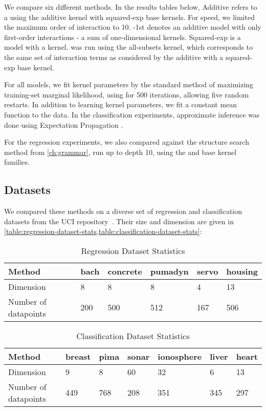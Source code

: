 We compare six different methods.
In the results tables below, \gp{} Additive refers to a \gp{} using the additive kernel with squared-exp base kernels.
For speed, we limited the maximum order of interaction to 10.
\gp{}-1st denotes an additive \gp{} model with only first-order interactions - a sum of one-dimensional kernels.
\gp{} Squared-exp is a \gp{} model with a \seard{} kernel.
\HKL{} was run using the all-subsets kernel, which corresponds to the same set of interaction terms as considered by the additive \gp{} with a squared-exp base kernel.

For all \gp{} models, we fit kernel parameters by the standard method of maximizing training-set marginal likelihood, using \LBFGS{} \citep{nocedal1980updating} for 500 iterations, allowing five random restarts.
In addition to learning kernel parameters, we fit a constant mean function to the data.
In the classification experiments, approximate \gp{} inference was done using Expectation Propagation \citep{minka2001expectation}.

For the regression experiments, we also compared against the structure search method from \cref{ch:grammar}, run up to depth 10, using the \SE{} and \RQ{} base kernel families.

\subsection{Datasets}

We compared these methods on a diverse set of regression and classification datasets from the UCI repository~\citep{UCI}.
Their size and dimension are given in \cref{table:regression-dataset-stats,table:classification-dataset-stats}:

\begin{table}[h]
\caption{Regression Dataset Statistics}
\label{tbl:Regression Dataset Statistics}
\begin{center}
\begin{tabular}{l | lllll}
Method & bach & concrete & pumadyn & servo & housing \\ \hline
Dimension      & 8    & 8        & 8       & 4     & 13 \\
Number of datapoints       & 200  & 500      & 512     & 167   & 506
\end{tabular}
\end{center}
\label{table:regression-dataset-stats}
\end{table}
%
\begin{table}[h]
\caption{Classification Dataset Statistics}
\label{tbl:Classification Dataset Statistics}
\begin{center}
\begin{tabular}{l | llllll}
Method & breast & pima & sonar & ionosphere & liver & heart\\ \hline
Dimension      & 9      & 8    & 60    & 32         & 6     & 13 \\
Number of datapoints      & 449    & 768  & 208   & 351        & 345   & 297
\end{tabular}
\end{center}
\label{table:classification-dataset-stats}
\end{table}

